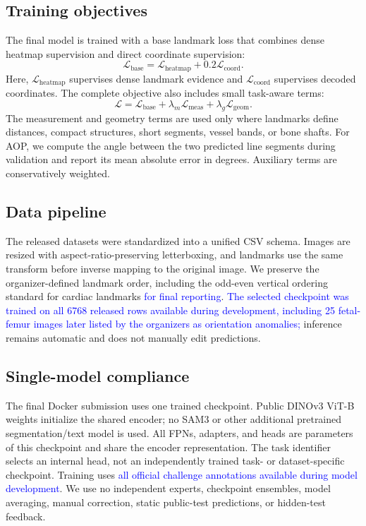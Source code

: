 \documentclass[runningheads]{llncs}
\newcommand{\revisiontext}[1]{\textcolor{blue}{#1}}
\begin{document}
\subsection{Training objectives}
The final model is trained with a base landmark loss that combines dense heatmap supervision and direct coordinate supervision:
\begin{equation}
\mathcal{L}_{\text{base}} =
\mathcal{L}_{\text{heatmap}} + 0.2 \mathcal{L}_{\text{coord}}.
\end{equation}
\noindent
Here, $\mathcal{L}_{\text{heatmap}}$ supervises dense landmark evidence and $\mathcal{L}_{\text{coord}}$ supervises decoded coordinates. The complete objective also includes small task-aware terms:
\begin{equation}
\mathcal{L} =
\mathcal{L}_{\text{base}}
+ \lambda_m \mathcal{L}_{\text{meas}}
+ \lambda_g \mathcal{L}_{\text{geom}}.
\end{equation}
The measurement and geometry terms are used only where landmarks define distances, compact structures, short segments, vessel bands, or bone shafts. For AOP, we compute the angle between the two predicted line segments during validation and report its mean absolute error in degrees. Auxiliary terms are conservatively weighted.
\subsection{Data pipeline}
The released datasets were standardized into a unified CSV schema. Images are resized with aspect-ratio-preserving letterboxing, and landmarks use the same transform before inverse mapping to the original image. We preserve the organizer-defined landmark order, including the odd-even vertical ordering standard for cardiac landmarks \revisiontext{for final reporting}. \revisiontext{The selected checkpoint was trained on all 6768 released rows available during development, including 25 fetal-femur images later listed by the organizers as orientation anomalies;} inference remains automatic and does not manually edit predictions.

\subsection{Single-model compliance}
\label{sec:single-model-compliance}
The final Docker submission uses one trained checkpoint. Public DINOv3 ViT-B weights initialize the shared encoder; no SAM3 or other additional pretrained segmentation/text model is used. All FPNs, adapters, and heads are parameters of this checkpoint and share the encoder representation. The task identifier selects an internal head, not an independently trained task- or dataset-specific checkpoint. Training uses \revisiontext{all official challenge annotations available during model development}. We use no independent experts, checkpoint ensembles, model averaging, manual correction, static public-test predictions, or hidden-test feedback.
\end{document}
